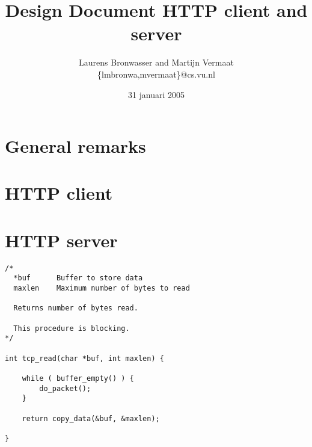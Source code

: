 \documentclass[11pt]{article}
\title{Design Document HTTP client and server}
\author{
    Laurens Bronwasser and Martijn Vermaat\\
    \{lmbronwa,mvermaat\}@cs.vu.nl
}
\date{31 januari 2005}
\begin{document}
\maketitle


\lstset{
  numbers=none,
  basicstyle=\small,
  frame=tb,
  language=C,
  captionpos=b
}


\section{General remarks}



\section{HTTP client}


\section{HTTP server}





\begin{lstlisting}[title=Procedure tcp\_read]
/*
  *buf      Buffer to store data
  maxlen    Maximum number of bytes to read

  Returns number of bytes read.

  This procedure is blocking.
*/

int tcp_read(char *buf, int maxlen) {

    while ( buffer_empty() ) {
        do_packet();
    }

    return copy_data(&buf, &maxlen);

}
\end{lstlisting}
\end{document}
